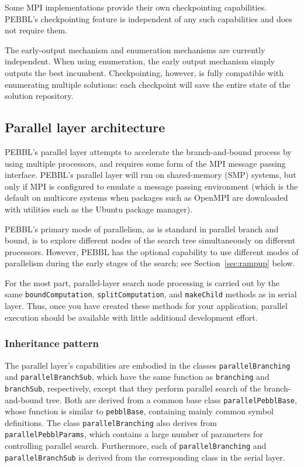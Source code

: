 Some MPI implementations provide their own checkpointing capabilities.
PEBBL's checkpointing feature is independent of any such capabilities
and does not require them.  

The early-output mechanism and enumeration mechanisms are
currently independent.  When using enumeration, the early output mechanism
simply outputs the best incumbent.  Checkpointing, however, is fully
compatible with enumerating multiple solutions: each checkpoint will
save the entire state of the solution repository.



\subsection{Parallel layer architecture}

PEBBL's parallel layer attempts to accelerate the branch-and-bound
process by using multiple processors, and requires some form of the
MPI message passing interface.  PEBBL's parallel layer will run on
shared-memory (SMP) systems, but only if MPI is configured to emulate a
message passing environment (which is the default on multicore systems
when packages such as OpenMPI are downloaded with utilities such as
the Ubuntu package manager).  

PEBBL's primary mode of parallelism, as is standard in parallel branch
and bound, is to explore different nodes of the search tree
simultaneously on different processors.  However, PEBBL has the
optional capability to use different modes of parallelism during the
early stages of the search; see Section~\ref{sec:rampup} below.

For the most part, parallel-layer search node processing is carried
out by the same \texttt{boundComputation}, \texttt{splitComputation},
and \texttt{makeChild} methods as in serial layer.  Thus, once you
have created these methods for your application, parallel execution
should be available with little additional development effort.


\subsubsection{Inheritance pattern}

The parallel layer's capabilities are embodied in the classes
\texttt{parallelBranching} and {\tt paral\-lel\-BranchSub}, which have the
same function as \texttt{branching} and \texttt{branchSub},
respectively, except that they perform parallel search of the
branch-and-bound tree.  Both are derived from a common base
class \texttt{parallelPebblBase}, whose function is similar to
\texttt{pebblBase}, containing mainly common symbol definitions.
The class \texttt{parallelBranching} also derives from
\texttt{parallelPebblParams}, which contains a large number of
parameters for controlling parallel search.  Furthermore, each of
\texttt{parallelBranching} and {\tt parallelBranchSub} is derived from
the corresponding class in the serial layer.

